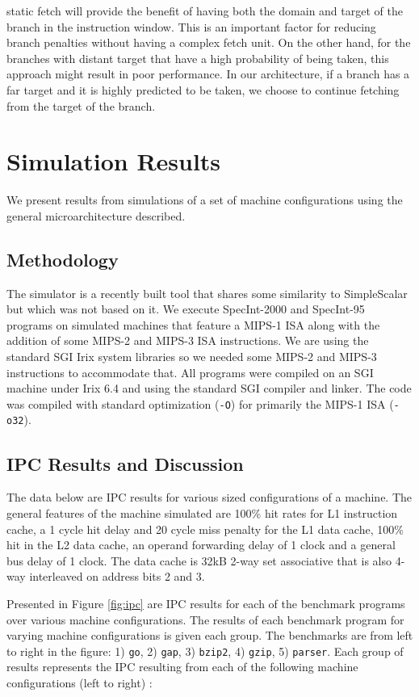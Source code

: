\documentclass[10pt,dvips]{article}
\begin{document}
static fetch will
provide the benefit of having both the domain and target of the branch 
in the instruction window.  This is an important factor for reducing
branch penalties without having a complex fetch unit.  On the other
hand, for the branches with distant target that have a high
probability of being taken, this approach might result in poor performance.
In our architecture, if a branch has a far target and it is highly predicted
to be taken, we choose to continue fetching from the target of the branch.

%
\section{Simulation Results}
%
We present results from simulations of a set of machine configurations
using the general microarchitecture described.
%
\subsection{Methodology}
%
The simulator is a recently built tool that shares some similarity
to SimpleScalar \cite{Austin97} but which was not based on it.
We execute
SpecInt-2000 and SpecInt-95 programs on simulated machines
that feature a MIPS-1 ISA along with the addition of some MIPS-2 and
MIPS-3 ISA instructions.  We are using the standard SGI Irix system
libraries so we needed some MIPS-2 and MIPS-3 instructions to accommodate
that.  All programs were compiled on an SGI machine under Irix 6.4 and
using the standard SGI compiler and linker.  The code was compiled with
standard optimization ({\tt -O}) for primarily the MIPS-1 ISA ({\tt -o32}).
%
\subsection{IPC Results and Discussion}
%
The data below are IPC results for various sized configurations of
a machine.  The general features of
the machine simulated are 100\% hit rates for L1 instruction cache,
a 1 cycle hit delay and 20 cycle miss penalty for the L1 data cache,
100\% hit in the L2 data cache, an operand forwarding delay of 1 clock
and a general bus delay of 1 clock.  The data cache is 32kB 2-way
set associative that is also 4-way interleaved on address bits 2 and 3.

Presented in 
Figure \ref{fig:ipc} are IPC results for each of the benchmark
programs over various machine configurations.
The results of each benchmark program for varying machine
configurations is given each group.  The benchmarks are from left to
right in the figure: 1) {\tt go}, 2) {\tt gap}, 3) {\tt bzip2},
4) {\tt gzip}, 5) {\tt parser}.  Each group of results represents
the IPC resulting from each of the following machine configurations (left
to right) :
\end{document}
